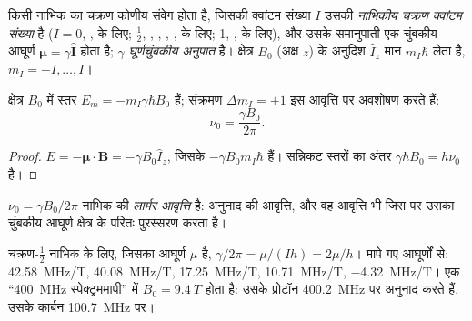 \begin{definition}[नाभिकीय चक्रण क्वांटम संख्या, घूर्णचुंबकीय अनुपात]\label{def:b3:advanced-nmr:nuclear-spin}
किसी नाभिक का चक्रण कोणीय संवेग होता है, जिसकी क्वांटम संख्या $I$ उसकी
\emph{नाभिकीय चक्रण क्वांटम संख्या} है ($I = 0$,
,  के लिए; $\frac12$, , , , ,
 के लिए; 1, ,  के लिए), और उसके समानुपाती एक चुंबकीय आघूर्ण $\boldsymbol\mu = \gamma\hat{\mathbf
I}$ होता है; $\gamma$ \emph{घूर्णचुंबकीय अनुपात} है।
क्षेत्र $B_0$ (अक्ष $z$) के अनुदिश $\hat I_z$ मान $m_I\hbar$ लेता है,
$m_I = -I, \dots, I$।
\end{definition}

\begin{proposition}[ज़ेमान स्तर]\label{prop:b3:advanced-nmr:zeeman}
क्षेत्र $B_0$ में स्तर $E_m = -m_I\gamma\hbar B_0$ हैं; संक्रमण $\Delta m_I = \pm1$
इस आवृत्ति पर अवशोषण करते हैं:
\[
\nu_0 = \frac{\gamma B_0}{2\pi}.
\]
\end{proposition}

\begin{proof}
$E = -\boldsymbol\mu\cdot\mathbf B = -\gamma B_0\hat I_z$, जिसके  $-\gamma B_0m_I\hbar$ हैं। सन्निकट
स्तरों का अंतर $\gamma\hbar B_0 = h\nu_0$ है।
\end{proof}

\begin{definition}[लार्मर आवृत्ति]\label{def:b3:advanced-nmr:larmor}
$\nu_0 = \gamma B_0/2\pi$ नाभिक की \emph{लार्मर आवृत्ति} है:
अनुनाद की आवृत्ति, और वह आवृत्ति भी जिस पर उसका
चुंबकीय आघूर्ण क्षेत्र के परितः पुरस्सरण करता है।
\end{definition}

\begin{example}[सामान्य नाभिक]\label{ex:b3:advanced-nmr:nuclei}
चक्रण-$\frac12$ नाभिक के लिए, जिसका आघूर्ण $\mu$ है, $\gamma/2\pi = \mu/(Ih) = 2\mu/h$।
मापे गए आघूर्णों से:  \qty{42.58}{MHz/T},  \qty{40.08}{MHz/T}, 
\qty{17.25}{MHz/T},  \qty{10.71}{MHz/T},  \qty{-4.32}{MHz/T}। एक
``\qty{400}{MHz} स्पेक्ट्रममापी'' में $B_0 = \qty{9.4}{T}$ होता है: उसके प्रोटॉन
\qty{400.2}{MHz} पर अनुनाद करते हैं, उसके कार्बन \qty{100.7}{MHz} पर।
\end{example}

